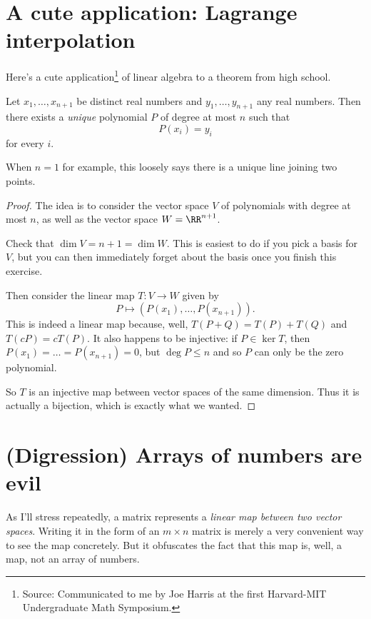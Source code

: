 \section{A cute application: Lagrange interpolation}
Here's a cute application\footnote{Source: Communicated to me
by Joe Harris at the first Harvard-MIT Undergraduate Math Symposium.}
of linear algebra to a theorem from high school.
\begin{theorem}
	Let $x_1, \dots, x_{n+1}$ be distinct real numbers
	and $y_1, \dots, y_{n+1}$ any real numbers.
	Then there exists a \emph{unique}
	polynomial $P$ of degree at most $n$
	such that \[ P(x_i) = y_i \] for every $i$.
\end{theorem}
When $n = 1$ for example, this loosely
says there is a unique line joining two points.
\begin{proof}
	The idea is to consider the vector space $V$
	of polynomials with degree at most $n$,
	as well as the vector space $W = \RR^{n+1}$.
	\begin{ques}
		Check that $\dim V = n + 1 = \dim W$.
		This is easiest to do if you pick a basis for $V$,
		but you can then immediately forget about the basis
		once you finish this exercise.
	\end{ques}
	Then consider the linear map $T \colon V \to W$ given by
	\[ P \mapsto \left( P(x_1), \dots, P(x_{n+1}) \right). \]
	This is indeed a linear map because,
	well, $T(P+Q) = T(P)+T(Q)$ and $T(cP) = cT(P)$.
	It also happens to be injective: if $P \in \ker T$,
	then $P(x_1) = \dots = P(x_{n+1}) = 0$,
	but $\deg P \le n$ and so $P$ can only be the zero polynomial.

	So $T$ is an injective map between vector spaces of the same dimension.
	Thus it is actually a bijection, which is exactly what we wanted.
\end{proof}

\section{(Digression) Arrays of numbers are evil}
\label{sec:basis_evil}
As I'll stress repeatedly, a matrix represents a
\emph{linear map between two vector spaces}.
Writing it in the form of an $m \times n$ matrix
is merely a very convenient way to see the map concretely.
But it obfuscates the fact that this map is,
well, a map, not an array of numbers.

